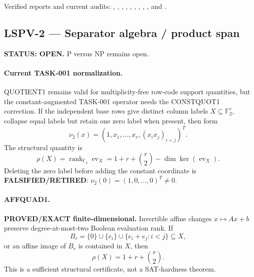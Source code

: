\documentclass[11pt]{article}
\begin{document}
Verified reports and current audits:
,
,
,
,
,
,
,
,
, and
.

\subsection{LSPV-2 --- Separator algebra / product span}
\textbf{STATUS: OPEN.} P versus NP remains open.

\paragraph{Current TASK-001 normalization.}
QUOTIENT1 remains valid for multiplicity-free row-code support quantities, but the constant-augmented TASK-001 operator needs the CONSTQUOT1 correction.  If the independent base rows give distinct column labels \(X\subseteq\mathbb F_2^r\), collapse equal labels but retain one zero label when present, then form
\[
 \nu_2(x)=\left(1,x_1,\ldots,x_r,(x_ix_j)_{i<j}\right)^T.
\]
The structural quantity is
\[
 \rho(X)=\operatorname{rank}_{\mathbb F_2}\operatorname{ev}_X
 =1+r+\binom r2-\dim\ker(\operatorname{ev}_X).
\]
Deleting the zero label before adding the constant coordinate is \textbf{FALSIFIED/RETIRED}: \(\nu_2(0)=(1,0,\ldots,0)^T\neq0\).

\paragraph{AFFQUAD1.}
\textbf{PROVED/EXACT finite-dimensional.}  Invertible affine changes \(x\mapsto Ax+b\) preserve degree-at-most-two Boolean evaluation rank.  If
\[
 B_r=\{0\}\cup\{e_i\}\cup\{e_i+e_j:i<j\}\subseteq X,
\]
or an affine image of \(B_r\) is contained in \(X\), then
\[
 \rho(X)=1+r+\binom r2.
\]
This is a sufficient structural certificate, not a SAT-hardness theorem.
\end{document}
